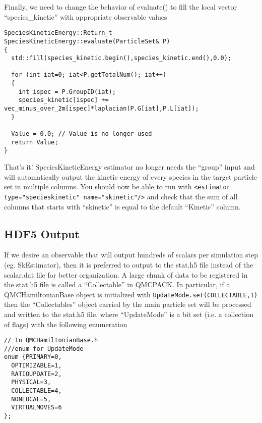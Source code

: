 Finally, we need to change the behavior of evaluate() to fill the local vector ``species\_kinetic'' with appropriate observable values
\begin{lstlisting}[style=C++]
SpeciesKineticEnergy::Return_t SpeciesKineticEnergy::evaluate(ParticleSet& P)
{
  std::fill(species_kinetic.begin(),species_kinetic.end(),0.0);

  for (int iat=0; iat<P.getTotalNum(); iat++)
  {
    int ispec = P.GroupID(iat);
    species_kinetic[ispec] += vec_minus_over_2m[ispec]*laplacian(P.G[iat],P.L[iat]);
  }
  
  Value = 0.0; // Value is no longer used
  return Value;
}
\end{lstlisting}
That's it! SpeciesKineticEnergy estimator no longer needs the ``group'' input and will automatically output the kinetic energy of every species in the target particle set in multiple columns. You should now be able to run with 
\verb|<estimator type="specieskinetic" name="skinetic"/>| and check that the sum of all columns that starts with ``skinetic'' is equal to the default ``Kinetic'' column.

\subsection{HDF5 Output}
If we desire an observable that will output hundreds of scalars per simulation step (eg. SkEstimator), then it is preferred to output to the stat.h5 file instead of the scalar.dat file for better organization. A large chunk of data to be registered in the stat.h5 file is called a ``Collectable'' in QMCPACK. In particular, if a QMCHamiltonianBase object is initialized with \verb|UpdateMode.set(COLLECTABLE,1)| then the ``Collectables'' object carried by the main particle set will be processed and written to the stat.h5 file, where ``UpdateMode'' is a bit set (i.e. a collection of flags) with the following enumeration
\begin{lstlisting}[style=C++]
// In QMCHamiltonianBase.h
///enum for UpdateMode
enum {PRIMARY=0,
  OPTIMIZABLE=1,
  RATIOUPDATE=2,
  PHYSICAL=3,
  COLLECTABLE=4,
  NONLOCAL=5,
  VIRTUALMOVES=6
};
\end{lstlisting}


